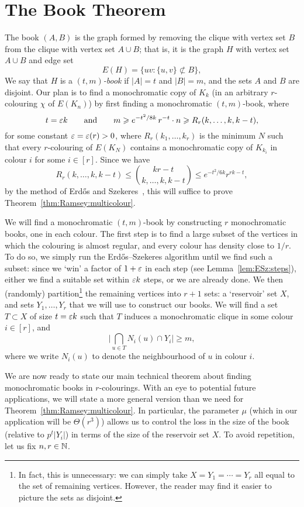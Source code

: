 \section{The Book Theorem}\label{sec:book:thm}

The book $(A,B)$ is the graph formed by removing the clique with vertex set $B$ from the clique with vertex set $A \cup B$; that is, it is the graph $H$ with vertex set $A \cup B$ and edge set
$$E(H) = \big\{ uv : \{u,v\} \not\subset B \big\},$$
We say that $H$ is a \emph{$(t,m)$-book} if $|A| = t$ and $|B|= m$, and the sets $A$ and $B$ are disjoint. Our plan is to find a monochromatic copy of $K_k$ (in an arbitrary $r$-colouring $\chi$ of $E(K_n)$) by first finding a monochromatic $(t,m)$-book, where
$$t = \varepsilon k \qquad \text{and} \qquad m \geqslant e^{-t^2/8k} \, r^{-t} \cdot n \geqslant R_r(k,\ldots,k,k-t),$$
for some constant $\varepsilon = \varepsilon(r) > 0$, where $R_r(k_1,\ldots,k_r)$ is the minimum $N$ such that every $r$-colouring of $E(K_N)$ contains a monochromatic copy of $K_{k_i}$ in colour $i$ for some $i \in [r]$. Since we have
$$R_r(k,\ldots,k,k-t) \le {kr - t \choose k,\ldots,k,k-t} \le e^{-t^2/6k} r^{rk-t},$$
by the method of Erd\H{o}s and Szekeres~\cite{ESz35}, this will suffice to prove Theorem~\ref{thm:Ramsey:multicolour}. 

We will find a monochromatic $(t,m)$-book by constructing $r$ monochromatic books, one in each colour. The first step is to find a large subset of the vertices in which the colouring is almost regular, and every colour has density close to $1/r$. To do so, we simply run the Erd\H{o}s--Szekeres algorithm until we find such a subset: since we `win' a factor of $1 + \varepsilon$ in each step (see Lemma~\ref{lem:ESz:steps}), either we find a suitable set within $\varepsilon k$ steps, or we are already done. We then (randomly) partition\footnote{In fact, this is unnecessary: we can simply take $X = Y_1 = \cdots = Y_r$ all equal to the set of remaining vertices. However, the reader may find it easier to picture the sets as disjoint.} the remaining vertices into $r+1$ sets: a `reservoir' set $X$, and sets $Y_1,\ldots,Y_r$ that we will use to construct our books. We will find a set $T \subset X$ of size $t = \varepsilon k$ such that $T$ induces a monochromatic clique in some colour $i \in [r]$, and 
$$\bigg| \bigcap_{u \in T} N_i(u) \cap Y_i \bigg| \ge m,$$
where we write $N_i(u)$ to denote the neighbourhood of $u$ in colour $i$. 

We are now ready to state our main technical theorem about finding monochromatic books in $r$-colourings. With an eye to potential future applications, we will state a more general version than we need for Theorem~\ref{thm:Ramsey:multicolour}. In particular, the parameter $\mu$ (which in our application will be $\Theta(r^3)$) allows us to control the loss in the size of the book (relative to $p^t |Y_i|$) in terms of the size of the reservoir set $X$. To avoid repetition, let us fix $n,r \in \mathbb{N}$.


